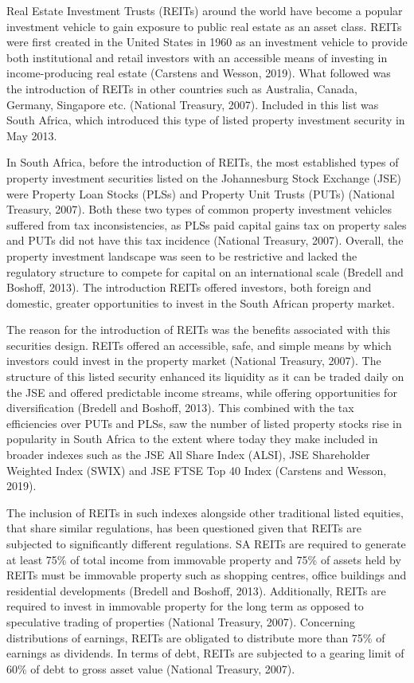 \documentclass[11pt,preprint, authoryear]{elsarticle}
\numberwithin{equation}{section}
\numberwithin{figure}{section}
\numberwithin{table}{section}
\begin{document}
Real Estate Investment Trusts (REITs) around the world have become a
popular investment vehicle to gain exposure to public real estate as an
asset class. REITs were first created in the United States in 1960 as an
investment vehicle to provide both institutional and retail investors
with an accessible means of investing in income-producing real estate
(Carstens and Wesson, 2019). What followed was the introduction of REITs
in other countries such as Australia, Canada, Germany, Singapore etc.
(National Treasury, 2007). Included in this list was South Africa, which
introduced this type of listed property investment security in May 2013.

In South Africa, before the introduction of REITs, the most established
types of property investment securities listed on the Johannesburg Stock
Exchange (JSE) were Property Loan Stocks (PLSs) and Property Unit Trusts
(PUTs) (National Treasury, 2007). Both these two types of common
property investment vehicles suffered from tax inconsistencies, as PLSs
paid capital gains tax on property sales and PUTs did not have this tax
incidence (National Treasury, 2007). Overall, the property investment
landscape was seen to be restrictive and lacked the regulatory structure
to compete for capital on an international scale (Bredell and Boshoff,
2013). The introduction REITs offered investors, both foreign and
domestic, greater opportunities to invest in the South African property
market.

The reason for the introduction of REITs was the benefits associated
with this securities design. REITs offered an accessible, safe, and
simple means by which investors could invest in the property market
(National Treasury, 2007). The structure of this listed security
enhanced its liquidity as it can be traded daily on the JSE and offered
predictable income streams, while offering opportunities for
diversification (Bredell and Boshoff, 2013). This combined with the tax
efficiencies over PUTs and PLSs, saw the number of listed property
stocks rise in popularity in South Africa to the extent where today they
make included in broader indexes such as the JSE All Share Index (ALSI),
JSE Shareholder Weighted Index (SWIX) and JSE FTSE Top 40 Index
(Carstens and Wesson, 2019).

The inclusion of REITs in such indexes alongside other traditional
listed equities, that share similar regulations, has been questioned
given that REITs are subjected to significantly different regulations.
SA REITs are required to generate at least 75\% of total income from
immovable property and 75\% of assets held by REITs must be immovable
property such as shopping centres, office buildings and residential
developments (Bredell and Boshoff, 2013). Additionally, REITs are
required to invest in immovable property for the long term as opposed to
speculative trading of properties (National Treasury, 2007). Concerning
distributions of earnings, REITs are obligated to distribute more than
75\% of earnings as dividends. In terms of debt, REITs are subjected to
a gearing limit of 60\% of debt to gross asset value (National Treasury,
2007).
\end{document}
